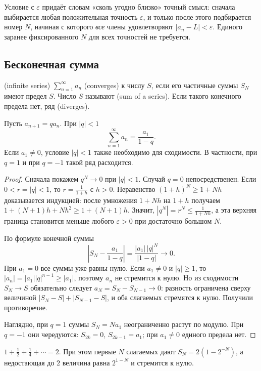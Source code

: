 Условие с \(\varepsilon\) придаёт словам «сколь угодно близко» точный смысл: сначала выбирается любая положительная точность \(\varepsilon\), и только после этого подбирается номер \(N\), начиная с которого \emph{все} члены удовлетворяют \(|a_n-L|<\varepsilon\). Единого заранее фиксированного \(N\) для всех точностей не требуется.

\subsection{Бесконечная сумма}
\begin{definition}
 (infinite series) \(\sum_{n=1}^{\infty}a_n\)  (converges) к числу \(S\), если его частичные суммы \(S_N\) имеют предел \(S\). Число \(S\) называют  (sum of a series). Если такого конечного предела нет, ряд  (diverges).
\end{definition}
\begin{theorem}\label{thm:legacy-c12-7}
Пусть \(a_{n+1}=q a_n\). При \(|q|<1\)
\[
\sum_{n=1}^{\infty}a_n=\frac{a_1}{1-q}.
\]
Если \(a_1\neq0\), условие \(|q|<1\) также необходимо для сходимости. В частности, при \(q=1\) и при \(q=-1\) такой ряд расходится.
\end{theorem}
\begin{proof}
Сначала покажем \(q^N\to0\) при \(|q|<1\). Случай \(q=0\) непосредственен. Если \(0<r=|q|<1\), то \(r=\frac1{1+h}\) с \(h>0\). Неравенство \((1+h)^N\geq1+Nh\) доказывается индукцией: после умножения \(1+Nh\) на \(1+h\) получаем \(1+(N+1)h+Nh^2\geq1+(N+1)h\). Значит, \(|q^N|=r^N\leq\frac1{1+Nh}\), а эта верхняя граница становится меньше любого \(\varepsilon>0\) при достаточно большом \(N\).

По формуле конечной суммы
\[
\left|S_N-\frac{a_1}{1-q}\right|=\frac{|a_1|\,|q|^N}{|1-q|}\longrightarrow0.
\]
При \(a_1=0\) все суммы уже равны нулю. Если \(a_1\neq0\) и \(|q|\geq1\), то \(|a_n|=|a_1||q|^{n-1}\geq|a_1|\), поэтому \(a_n\) не стремится к нулю. Но из сходимости \(S_N\to S\) обязательно следует \(a_N=S_N-S_{N-1}\to0\): разность ограничена сверху величиной \(|S_N-S|+|S_{N-1}-S|\), и оба слагаемых стремятся к нулю. Получили противоречие.

Наглядно, при \(q=1\) суммы \(S_N=Na_1\) неограниченно растут по модулю. При \(q=-1\) они чередуются: \(S_{2k}=0\), \(S_{2k-1}=a_1\); при \(a_1\neq0\) единого предела нет.
\end{proof}
\begin{example}
\(1+\frac12+\frac14+\cdots=2\). При этом первые \(N\) слагаемых дают \(S_N=2(1-2^{-N})\), а недостающая до \(2\) величина равна \(2^{1-N}\) и стремится к нулю.
\end{example}

